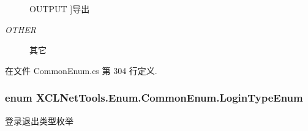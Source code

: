 \begin{Desc}
\begin{description}
{\hypertarget{class_x_c_l_net_tools_1_1_enum_1_1_common_enum_af5501e481d93b082864bdcfb5fdb9596a50a87f0d71f7221582dad4bf507a0f34}{O\-U\-T\-P\-U\-T}\label{class_x_c_l_net_tools_1_1_enum_1_1_common_enum_af5501e481d93b082864bdcfb5fdb9596a50a87f0d71f7221582dad4bf507a0f34}
}]导出 \item[{\em 
\hypertarget{class_x_c_l_net_tools_1_1_enum_1_1_common_enum_af5501e481d93b082864bdcfb5fdb9596a03570470bad94692ce93e32700d2e1cb}{O\-T\-H\-E\-R}\label{class_x_c_l_net_tools_1_1_enum_1_1_common_enum_af5501e481d93b082864bdcfb5fdb9596a03570470bad94692ce93e32700d2e1cb}
}]其它 \end{description}
\end{Desc}


在文件 Common\-Enum.\-cs 第 304 行定义.

\hypertarget{class_x_c_l_net_tools_1_1_enum_1_1_common_enum_a2d2cb4aef1c5cbc23f73c25b5f0c2948}{
\subsubsection[{Login\-Type\-Enum}]{\setlength{\rightskip}{0pt plus 5cm}enum {\bf X\-C\-L\-Net\-Tools.\-Enum.\-Common\-Enum.\-Login\-Type\-Enum}}}\label{class_x_c_l_net_tools_1_1_enum_1_1_common_enum_a2d2cb4aef1c5cbc23f73c25b5f0c2948}


登录退出类型枚举 

